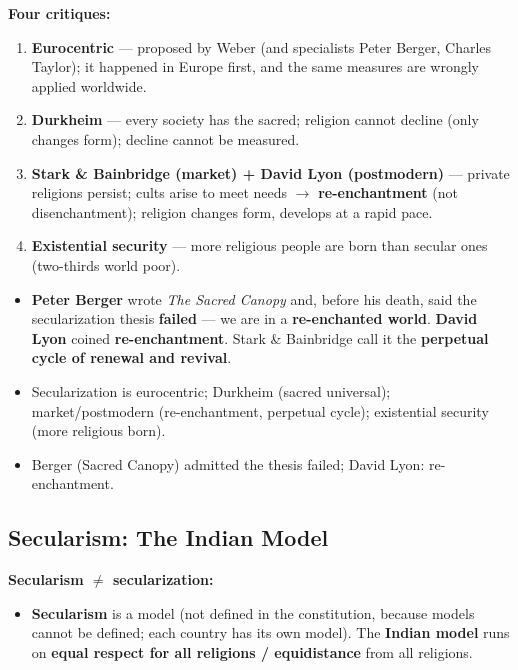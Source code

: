 \begin{CriticalPoint}
\textbf{Four critiques:}
\begin{enumerate}
\item \textbf{Eurocentric} --- proposed by Weber (and specialists Peter Berger, Charles Taylor); it happened in Europe first, and the same measures are wrongly applied worldwide.
\item \textbf{Durkheim} --- every society has the sacred; religion cannot decline (only changes form); decline cannot be measured.
\item \textbf{Stark \& Bainbridge (market) + David Lyon (postmodern)} --- private religions persist; cults arise to meet needs $\rightarrow$ \textbf{re-enchantment} (not disenchantment); religion changes form, develops at a rapid pace.
\item \textbf{Existential security} --- more religious people are born than secular ones (two-thirds world poor).
\end{enumerate}
\begin{itemize}
\item \textbf{Peter Berger} wrote \textit{The Sacred Canopy} and, before his death, said the secularization thesis \textbf{failed} --- we are in a \textbf{re-enchanted world}. \textbf{David Lyon} coined \textbf{re-enchantment}. Stark \& Bainbridge call it the \textbf{perpetual cycle of renewal and revival}.
\end{itemize}
\end{CriticalPoint}

\begin{QuickRevision}
\begin{itemize}
\item Secularization is eurocentric; Durkheim (sacred universal); market/postmodern (re-enchantment, perpetual cycle); existential security (more religious born).
\item Berger (Sacred Canopy) admitted the thesis failed; David Lyon: re-enchantment.
\end{itemize}
\end{QuickRevision}

\sectiondivider

\subsection{Secularism: The Indian Model}

\begin{KeyConcept}
\textbf{Secularism $\neq$ secularization:}
\begin{itemize}
\item \textbf{Secularism} is a model (not defined in the constitution, because models cannot be defined; each country has its own model). The \textbf{Indian model} runs on \textbf{equal respect for all religions / equidistance} from all religions.
\end{itemize}
\end{KeyConcept}

